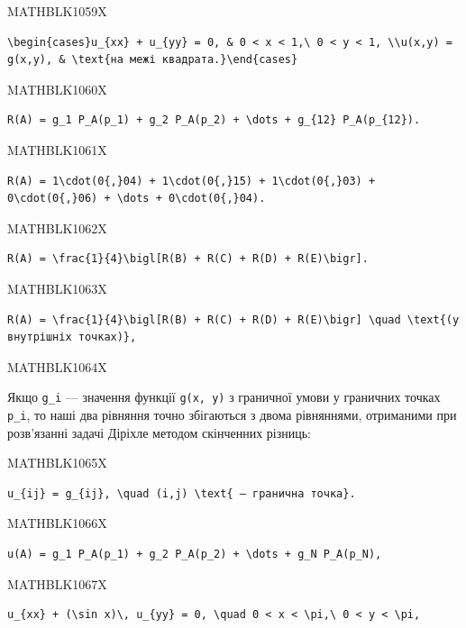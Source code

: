 \documentclass[
  ukrainian,
]{article}
\begin{document}
MATHBLK1059X

\begin{verbatim}
\begin{cases}u_{xx} + u_{yy} = 0, & 0 < x < 1,\ 0 < y < 1, \\u(x,y) = g(x,y), & \text{на межі квадрата.}\end{cases}
\end{verbatim}

MATHBLK1060X

\begin{verbatim}
R(A) = g_1 P_A(p_1) + g_2 P_A(p_2) + \dots + g_{12} P_A(p_{12}).
\end{verbatim}

MATHBLK1061X

\begin{verbatim}
R(A) = 1\cdot(0{,}04) + 1\cdot(0{,}15) + 1\cdot(0{,}03) + 0\cdot(0{,}06) + \dots + 0\cdot(0{,}04).
\end{verbatim}

MATHBLK1062X

\begin{verbatim}
R(A) = \frac{1}{4}\bigl[R(B) + R(C) + R(D) + R(E)\bigr].
\end{verbatim}

MATHBLK1063X

\begin{verbatim}
R(A) = \frac{1}{4}\bigl[R(B) + R(C) + R(D) + R(E)\bigr] \quad \text{(у внутрішніх точках)},
\end{verbatim}

MATHBLK1064X

Якщо \texttt{g\_i} --- значення функції \texttt{g(x,\ y)} з граничної
умови у граничних точках \texttt{p\_i}, то наші два рівняння точно
збігаються з двома рівняннями, отриманими при розв'язанні задачі Діріхле
методом скінченних різниць:

MATHBLK1065X

\begin{verbatim}
u_{ij} = g_{ij}, \quad (i,j) \text{ — гранична точка}.
\end{verbatim}

MATHBLK1066X

\begin{verbatim}
u(A) = g_1 P_A(p_1) + g_2 P_A(p_2) + \dots + g_N P_A(p_N),
\end{verbatim}

MATHBLK1067X

\begin{verbatim}
u_{xx} + (\sin x)\, u_{yy} = 0, \quad 0 < x < \pi,\ 0 < y < \pi,
\end{verbatim}
\end{document}
